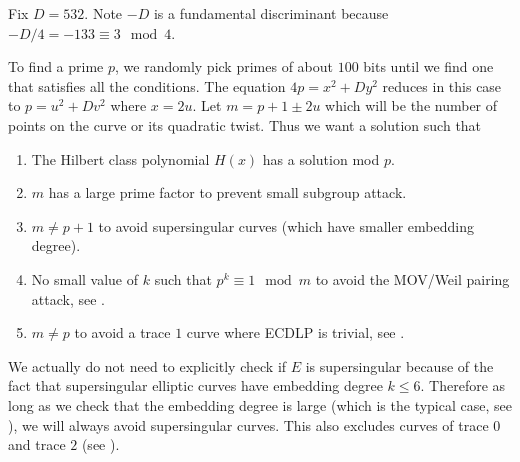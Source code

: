 \documentclass[11pt]{article}
\begin{document}
Fix $D = 532$. Note $-D$ is a fundamental discriminant because $-D/4 = -133 \equiv 3\mod{4}$.

To find a prime $p$, we randomly pick primes of about $100$ bits until we find one that satisfies all the conditions. The equation $4p = x^2 + Dy^2$ reduces in this case to $p = u^2 + Dv^2$ where $x = 2u$. Let $m = p + 1 \pm 2u$ which will be the number of points on the curve or its quadratic twist. Thus we want a solution such that
\begin{enumerate}[$\bullet$]
	\item The Hilbert class polynomial $H(x)$ has a solution mod $p$.
	\item $m$ has a large prime factor to prevent small subgroup attack.
	\item $m \neq p+1$ to avoid supersingular curves (which have smaller embedding degree).
	\item No small value of $k$ such that $p^k\equiv 1\mod{m}$ to avoid the MOV/Weil pairing attack, see \cite[Pg.~169]{hankerson2004guide}.
	\item $m\neq p$ to avoid a trace $1$ curve where ECDLP is trivial, see \cite{nigel1997trace1}.
\end{enumerate}
\begin{rem}
	We actually do not need to explicitly check if $E$ is supersingular because of the fact that supersingular elliptic curves have embedding degree $k\leq 6$. Therefore as long as we check that the embedding degree is large (which is the typical case, see \cite[Rem.~XI.6.3, Pg.~388]{silverman2009arithmetic}), we will always avoid supersingular curves. This also excludes curves of trace $0$ and trace $2$ (see \cite[Ch.~V.7]{blake1999elliptic}).
\end{rem}
\end{document}
